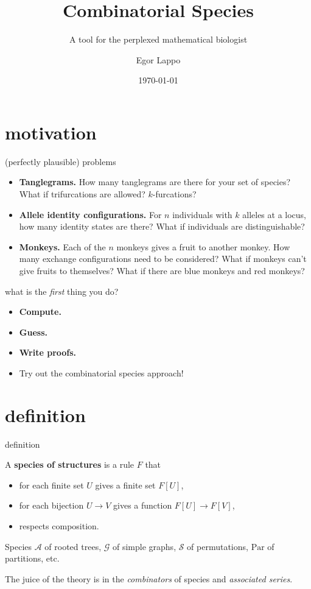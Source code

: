 \documentclass{beamer}
\title{Combinatorial Species}
\subtitle{A tool for the perplexed mathematical biologist}
\date{\today}
\author{Egor Lappo}
\institute{Follow along at \href{github.com/EgorLappo/tanglegram-species}{https://github.com/EgorLappo/tanglegram-species}}
\begin{document}
\maketitle
\section{motivation}

\begin{frame}{(perfectly plausible) problems}
  \begin{itemize}
    \item \textbf{Tanglegrams.} How many tanglegrams are there for your set of species? \pause What if trifurcations are allowed? \pause $k$-furcations? \pause
    \item \textbf{Allele identity configurations.} For $n$ individuals with $k$ alleles at a locus, how many identity states are there? \pause What if individuals are distinguishable? \pause
    \item \textbf{Monkeys.} Each of the $n$ monkeys gives a fruit to another monkey. How many exchange configurations need to be considered? \pause What if monkeys can't give fruits to themselves? \pause What if there are blue monkeys and red monkeys?
  \end{itemize}
\end{frame}

\begin{frame}{what is the \emph{first} thing you do?}
  \pause
  \begin{itemize}
    \item \textbf{Compute.} \pause
    \item \textbf{Guess.} \pause
    \item \textbf{Write proofs.} \pause
    \item Try out the combinatorial species approach!
  \end{itemize}
\end{frame}

\section{definition}

\begin{frame}{definition}
  \begin{definition}
    A \textbf{species of structures} is a rule $F$ that
    \begin{itemize}
      \item for each finite set $U$ gives a finite set $F[U]$,
      \item for each bijection $U\to V$ gives a function $F[U] \to F[V]$,
      \item respects composition.
    \end{itemize}
  \end{definition} \pause
  \begin{example}
    Species $\mathcal A$ of rooted trees, $\mathcal G$ of simple graphs, $\mathcal S$ of permutations, $\mathrm{Par}$ of partitions, etc.
  \end{example} \pause
  The juice of the theory is in the \emph{combinators} of species and \emph{associated series}.
\end{frame}
\end{document}

